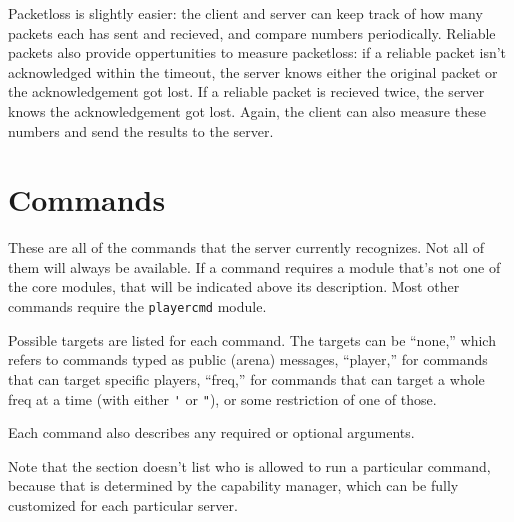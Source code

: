 \documentclass{article}
\begin{document}
Packetloss is slightly easier: the client and server can keep track of
how many packets each has sent and recieved, and compare numbers
periodically. Reliable packets also provide oppertunities to measure
packetloss: if a reliable packet isn't acknowledged within the timeout,
the server knows either the original packet or the acknowledgement got
lost. If a reliable packet is recieved twice, the server knows the
acknowledgement got lost. Again, the client can also measure these
numbers and send the results to the server.




%
%


\section{Commands}

These are all of the commands that the server currently recognizes. Not
all of them will always be available. If a command requires a module
that's not one of the core modules, that will be indicated above its
description. Most other commands require the \texttt{playercmd} module.

Possible targets are listed for each command. The targets can be
``none,'' which refers to commands typed as public (arena) messages,
``player,'' for commands that can target specific players, ``freq,'' for
commands that can target a whole freq at a time (with either \verb/'/ or
\verb/"/), or some restriction of one of those.

Each command also describes any required or optional arguments.

Note that the section doesn't list who is allowed to run a particular
command, because that is determined by the capability manager, which can
be fully customized for each particular server.


\end{document}
